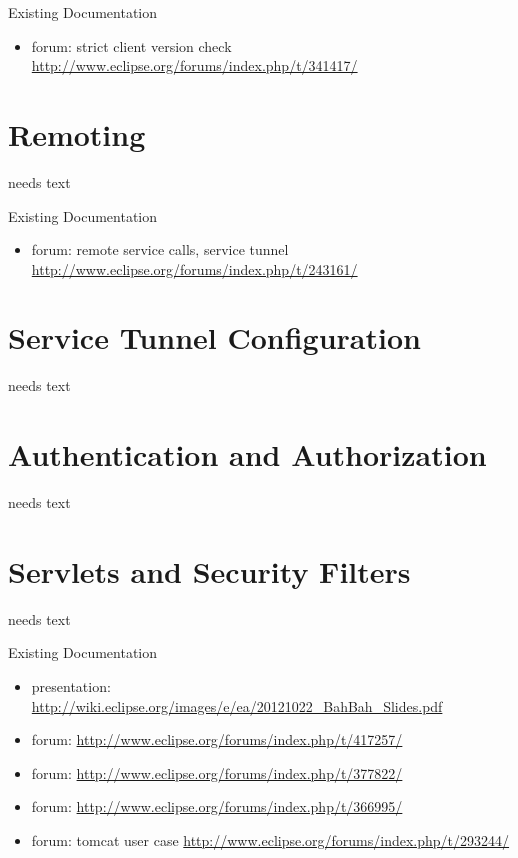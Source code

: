 \documentclass[a4paper,10pt,twoside]{book}
\begin{document}
\noindent Existing Documentation
\begin{itemize}
  \item forum: strict client version check \url{http://www.eclipse.org/forums/index.php/t/341417/}
\end{itemize}

\section{Remoting}
needs text

\noindent Existing Documentation
\begin{itemize}
  \item forum: remote service calls, service tunnel \url{http://www.eclipse.org/forums/index.php/t/243161/}
\end{itemize}

\section{Service Tunnel Configuration}
needs text
  
\section{Authentication and Authorization}
needs text

\section{Servlets and Security Filters}
needs text

\noindent Existing Documentation
\begin{itemize}
  \item presentation: \url{http://wiki.eclipse.org/images/e/ea/20121022_BahBah_Slides.pdf}
  \item forum: \url{http://www.eclipse.org/forums/index.php/t/417257/}
  \item forum: \url{http://www.eclipse.org/forums/index.php/t/377822/}
  \item forum: \url{http://www.eclipse.org/forums/index.php/t/366995/}
  \item forum: tomcat user case \url{http://www.eclipse.org/forums/index.php/t/293244/}
\end{itemize}
\end{document}
